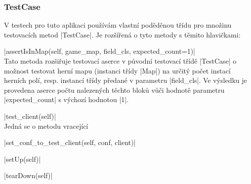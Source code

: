 \subsubsection{TestCase}

V testech pro tuto aplikaci používám vlastní poděděnou třídu pro množinu testovacích metod \ic|TestCase|. Je rozšířená o tyto metody s těmito hlavičkami:
\begin{description}
	\item \ic|assertIsInMap(self, game_map, field_cls, expected_count=1)| \\
	Tato metoda rozšiřuje testovací aserce v původní testovací třídě \ic|TestCase| o možnost testovat herní mapu (instanci třídy \ic|Map|) na určitý počet instací herních polí, resp. instancí třídy předané v parametru \ic|field_cls|. Ve výsledku je provedena aserce počtu nalezených těchto bloků vůči hodnotě parametru \ic|expected_count| s výchozí hodnotou \ic|1|.
	
    \item \ic|test_client(self)| \\
    Jedná se o metodu vracející 

    \item \ic|set_conf_to_test_client(self, conf, client)| \\

    \item \ic|setUp(self)| \\

    \item \ic|tearDown(self)| \\

\end{description}